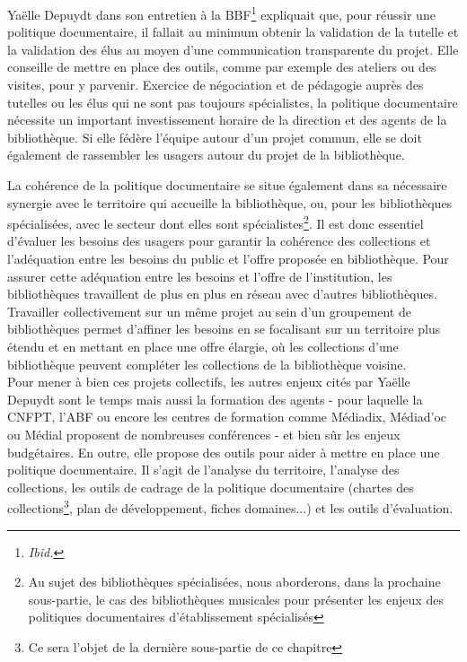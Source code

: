  Yaëlle Depuydt dans son entretien à la BBF\footnote{\textit{Ibid.}} expliquait que, pour réussir une politique documentaire, il fallait au minimum obtenir la validation de la tutelle et la validation des élus au moyen d'une communication transparente du projet. Elle conseille de mettre en place des outils, comme par exemple des ateliers ou des visites, pour y parvenir. 
Exercice de négociation et de pédagogie auprès des tutelles ou les élus qui ne sont pas toujours spécialistes, la politique documentaire nécessite un important investissement horaire de la direction et des agents de la bibliothèque. Si elle fédère l'équipe autour d'un projet commun, elle se doit également de rassembler les usagers autour du projet de la bibliothèque. 

La cohérence de la politique documentaire se situe également dans sa nécessaire synergie avec le territoire qui accueille la bibliothèque, ou, pour les bibliothèques spécialisées, avec le secteur dont elles sont spécialistes\footnote{Au sujet des bibliothèques spécialisées, nous aborderons, dans la prochaine sous-partie, le cas des bibliothèques musicales pour présenter les enjeux des politiques documentaires d'établissement spécialisés}.
Il est donc essentiel d'évaluer les besoins des usagers pour garantir la cohérence des collections et l'adéquation entre les besoins du public et l'offre proposée en bibliothèque. 
Pour assurer cette adéquation entre les besoins et l'offre de l'institution, les bibliothèques travaillent de plus en plus en réseau avec d'autres bibliothèques. Travailler collectivement sur un même projet au sein d'un groupement de bibliothèques permet d'affiner les besoins en se focalisant sur un territoire plus étendu et en mettant en place une offre élargie, où les collections d'une bibliothèque peuvent compléter les collections de la bibliothèque voisine.\\

Pour mener à bien ces projets collectifs, les autres enjeux cités par Yaëlle Depuydt sont le temps mais aussi la formation des agents - pour laquelle la CNFPT, l'ABF ou encore les centres de formation comme Médiadix, Médiad'oc ou Médial proposent de nombreuses conférences - et bien sûr les enjeux budgétaires. En outre, elle propose des outils pour aider à mettre en place une politique documentaire. Il s'agit de l'analyse du territoire, l'analyse des collections, les outils de cadrage de la politique documentaire (chartes des collections\footnote{Ce sera l'objet de la dernière sous-partie de ce chapitre }, plan de développement, fiches domaines...) et les outils d'évaluation.\\

